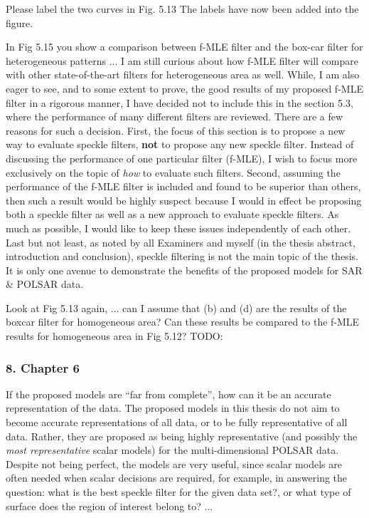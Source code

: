 \replyToComment
    {Please label the two curves in Fig. 5.13}
    {The labels have now been added into the figure.}    

\replyToComment
    {
      In Fig 5.15 you show a comparison between f-MLE filter and the box-car filter for heterogeneous patterns ...
      I am still curious about how f-MLE filter will compare with other state-of-the-art filters for heterogeneous area as well.
    }
    {
While, I am also eager to see, and to some extent to prove, the good results of my proposed f-MLE filter in a rigorous manner,
  I have decided not to include this in the section 5.3, where the performance of many different filters are reviewed.
There are a few reasons for such a decision.
First, the focus of this section is to propose a new way to evaluate speckle filters, \textbf{not} to propose any new speckle filter.
Instead of discussing the performance of one particular filter (f-MLE), I wish to focus more exclusively on the topic of \textit{how} to evaluate such filters.
Second, assuming the performance of the f-MLE filter is included and found to be superior than others,
  then such a result would be highly suspect
because I would in effect be proposing both a speckle filter as well as a new approach to evaluate speckle filters.
As much as possible, I would like to keep these issues independently of each other.
Last but not least, as noted by all Examiners and myself (in the thesis abstract, introduction and conclusion), speckle filtering is not the main topic of the thesis.
It is only one avenue to demonstrate the benefits of the proposed models for SAR \& POLSAR data.
    }

\replyToComments
    {
      Look at Fig 5.13 again, ... can I assume that (b) and (d) are the results of the boxcar filter for homogeneous area?
      Can these results be compared to the f-MLE results for homogeneous area in Fig 5.12?
    }
    {
      TODO:
    }    



    
\subsubsection*{8. Chapter 6}

\replyToComment
    {If the proposed models are ``far from complete'', how can it be an accurate representation of the data.}
    {The proposed models in this thesis do not aim to become accurate representations of all data, or to be fully representative of all data.
Rather, they are proposed as being highly representative (and possibly the \textit{most representative} scalar models) for the multi-dimensional POLSAR data.
Despite not being perfect, the models are very useful, since scalar models are often needed when scalar decisions are required,
  for example, in answering the question: what is the best speckle filter for the given data set?, or what type of surface does the region of interest belong to? ...
}


